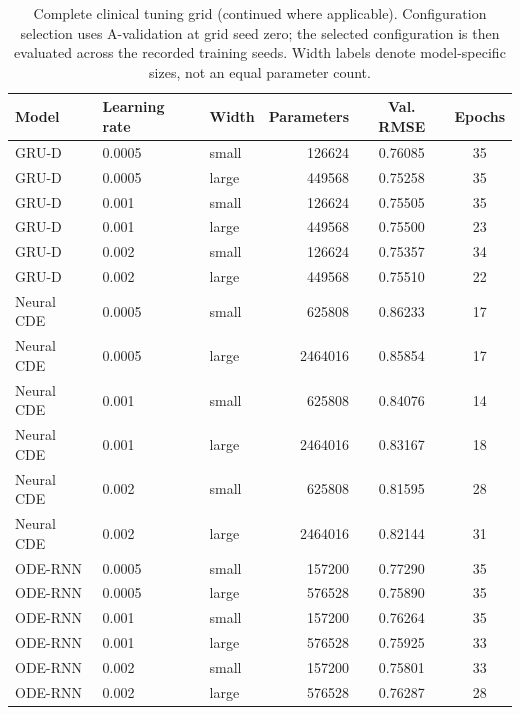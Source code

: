 \clearpage
\begin{table}[tbp]
\centering
\caption{Complete clinical tuning grid (continued where applicable). Configuration selection uses A-validation at grid seed zero; the selected configuration is then evaluated across the recorded training seeds. Width labels denote model-specific sizes, not an equal parameter count.}\label{tab:grid18}
\small\setlength{\tabcolsep}{4pt}
\begin{tabular}{lllrcc}
\toprule
Model 
& Learning rate 
& Width 
& Parameters 
& Val. RMSE 
& Epochs 
\\
\midrule
GRU-D 
& 0.0005 
& small 
& 126624 
& 0.76085 
& 35 
\\
GRU-D 
& 0.0005 
& large 
& 449568 
& 0.75258 
& 35 
\\
GRU-D 
& 0.001 
& small 
& 126624 
& 0.75505 
& 35 
\\
GRU-D 
& 0.001 
& large 
& 449568 
& 0.75500 
& 23 
\\
GRU-D 
& 0.002 
& small 
& 126624 
& 0.75357 
& 34 
\\
GRU-D 
& 0.002 
& large 
& 449568 
& 0.75510 
& 22 
\\
Neural CDE 
& 0.0005 
& small 
& 625808 
& 0.86233 
& 17 
\\
Neural CDE 
& 0.0005 
& large 
& 2464016 
& 0.85854 
& 17 
\\
Neural CDE 
& 0.001 
& small 
& 625808 
& 0.84076 
& 14 
\\
Neural CDE 
& 0.001 
& large 
& 2464016 
& 0.83167 
& 18 
\\
Neural CDE 
& 0.002 
& small 
& 625808 
& 0.81595 
& 28 
\\
Neural CDE 
& 0.002 
& large 
& 2464016 
& 0.82144 
& 31 
\\
ODE-RNN 
& 0.0005 
& small 
& 157200 
& 0.77290 
& 35 
\\
ODE-RNN 
& 0.0005 
& large 
& 576528 
& 0.75890 
& 35 
\\
ODE-RNN 
& 0.001 
& small 
& 157200 
& 0.76264 
& 35 
\\
ODE-RNN 
& 0.001 
& large 
& 576528 
& 0.75925 
& 33 
\\
ODE-RNN 
& 0.002 
& small 
& 157200 
& 0.75801 
& 33 
\\
ODE-RNN 
& 0.002 
& large 
& 576528 
& 0.76287 
& 28 
\\
\bottomrule
\end{tabular}
\end{table}

